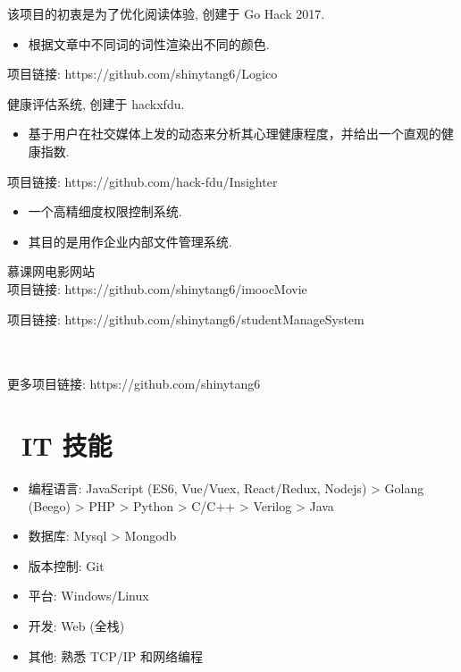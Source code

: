\documentclass{resume}
\begin{document}
该项目的初衷是为了优化阅读体验, 创建于 Go Hack 2017.
\begin{itemize}
  \item 根据文章中不同词的词性渲染出不同的颜色.
\end{itemize}
项目链接: https://github.com/shinytang6/Logico


健康评估系统, 创建于 hackxfdu.
\begin{itemize}
  \item 基于用户在社交媒体上发的动态来分析其心理健康程度，并给出一个直观的健康指数.
\end{itemize}
项目链接: https://github.com/hack-fdu/Insighter

\begin{itemize}
  \item 一个高精细度权限控制系统.
  \item 其目的是用作企业内部文件管理系统.
\end{itemize}

慕课网电影网站\\
项目链接: https://github.com/shinytang6/imoocMovie

项目链接: https://github.com/shinytang6/studentManageSystem

\\
\\
更多项目链接: https://github.com/shinytang6



\section{\faCogs\ IT 技能}
\begin{itemize}[parsep=0.5ex]
  \item 编程语言: JavaScript (ES6, Vue/Vuex, React/Redux, Nodejs) > Golang (Beego) > PHP > Python > C/C++ > Verilog > Java
  \item 数据库: Mysql > Mongodb
  \item 版本控制: Git
  \item 平台: Windows/Linux
  \item 开发: Web (全栈)
  \item 其他: 熟悉 TCP/IP 和网络编程
\end{itemize}
\end{document}
